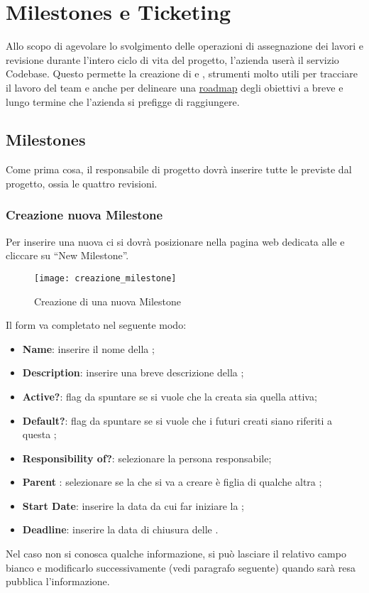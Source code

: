 \clearpage
\section{Milestones e Ticketing}
Allo scopo di agevolare lo svolgimento delle operazioni di assegnazione dei lavori e revisione durante l'intero ciclo di vita del progetto, l'azienda \team{} userà il servizio Codebase. Questo permette la creazione di  e \underline{}, strumenti molto utili per tracciare il lavoro del team e anche per delineare una \underline{roadmap} degli obiettivi a breve e lungo termine che l'azienda si prefigge di raggiungere.

\subsection{Milestones}
Come prima cosa, il responsabile di progetto dovrà inserire tutte le  previste dal progetto, ossia le quattro revisioni.
\subsubsection{Creazione nuova Milestone}
\label{sec:creazione_milestone}
Per inserire una nuova  ci si dovrà posizionare nella pagina web dedicata alle  e cliccare su ``New Milestone''.
\begin{figure}[h]
\texttt{[image: creazione\_milestone]}
\caption{Creazione di una nuova Milestone} \label{fig:creazione_milestone}
\end{figure}
Il form va completato nel seguente modo:
\begin{itemize}
\item \textbf{Name}: inserire il nome della ;
\item \textbf{Description}: inserire una breve descrizione della ;
\item \textbf{Active?}: flag da spuntare se si vuole che la  creata sia quella attiva;
\item \textbf{Default?}: flag da spuntare se si vuole che i futuri  creati siano riferiti a questa ;
\item \textbf{Responsibility of?}: selezionare la persona responsabile;
\item \textbf{Parent }: selezionare se la  che si va a creare è figlia di qualche altra ;
\item \textbf{Start Date}: inserire la data da cui far iniziare la ;
\item \textbf{Deadline}: inserire la data di chiusura delle .
\end{itemize}
Nel caso non si conosca qualche informazione, si può lasciare il relativo campo bianco e modificarlo successivamente (vedi paragrafo seguente) quando sarà resa pubblica l'informazione.

